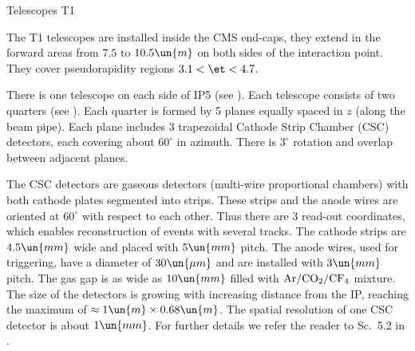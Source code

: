 
\caption{Telescopes T1}

The T1 telescopes are installed inside the CMS end-caps, they extend in the forward areas from $7.5$ to $10.5\un{m}$ on both sides of the interaction point. They cover pseudorapidity regions $3.1 < \et < 4.7$.

There is one telescope on each side of IP5 (see ). Each telescope consists of two quarters (see ). Each quarter is formed by 5 planes equally spaced in $z$ (along the beam pipe). Each plane includes 3 trapezoidal Cathode Strip Chamber (CSC) detectors, each covering about $60^\circ$ in azimuth. There is $3^\circ$ rotation and overlap between adjacent planes.

\bmfig
{}
\emfig

The CSC detectors are gaseous detectors (multi-wire proportional chambers) with both cathode plates segmented into strips. These strips and the anode wires are oriented at $60^\circ$ with respect to each other. Thus there are 3 read-out coordinates, which enables reconstruction of events with several 
tracks. The cathode strips are $4.5\un{mm}$ wide and placed with $5\un{mm}$ pitch. The anode wires, used for triggering, have a diameter of $30\un{\mu m}$ and are installed with $3\un{mm}$ pitch. The gas gap is as wide as $10\un{mm}$ filled with $\rm Ar/CO_2/CF_4$ mixture. The size of the detectors is growing with increasing distance from the IP, reaching the maximum of $\approx 1\un{m} \times 0.68\un{m}$. The spatial resolution of one CSC detector is about $1\un{mm}$. For further details we refer the reader to Sc.~5.2 in .




